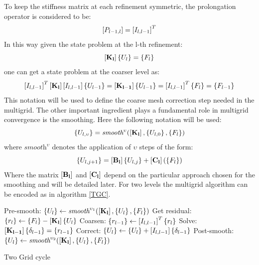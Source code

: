  To keep the stiffness matrix at each refinement symmetric, the prolongation operator is considered to be:
 \begin{equation}
 \left[{P_{l-1,l}}\right]=\left[{I_{l,l-1}}\right]^T
 \end{equation}
 In this way given the state problem at the l-th refinement:
 \begin{equation}
 \left[{\mathbf{K_{l}}}\right]\left\lbrace{U_{l}}\right \rbrace=\left\lbrace{F_{l}}\right \rbrace
 \end{equation}
 one can get a state problem at the coarser level as:
  \begin{equation}
  \left[{I_{l,l-1}}\right]^T \left[{\mathbf{K_{l}}}\right]\left[{I_{l,l-1}}\right]\left\lbrace{U_{l-1}}\right \rbrace=\left[{\mathbf{K_{l-1}}}\right]\left\lbrace{U_{l-1}}\right \rbrace=\left[{I_{l,l-1}}\right]^T\left\lbrace{F_{l}}\right \rbrace=\left\lbrace{F_{l-1}}\right \rbrace
  \end{equation}
  This notation will be used to define the coarse mesh correction step needed in the multigrid. The other important ingredient plays a fundamental role in multigrid convergence is the smoothing.
  Here the following notation will be used:
  \begin{equation}
 \left\lbrace{U_{l,\upsilon}}\right \rbrace=\textit{smooth}^{\upsilon}(\left[{\mathbf{K_{l}}}\right],\left\lbrace{U_{l,0}}\right \rbrace,\left\lbrace{F_{l}}\right \rbrace)
  \end{equation}
  where $\textit{smooth}^{\upsilon}$ denotes the application of $\upsilon$ steps of the form:
  \begin{equation}
 \left\lbrace{ U_{l,j+1}}\right \rbrace= \left[{\mathbf{B_{l}}}\right]\left\lbrace{U_{l,j}}\right \rbrace+\left[{\mathbf{C_{l}}}\right]\left(\left\lbrace{F_{l}}\right \rbrace\right)
  \end{equation}
  Where the matrix $\left[{\mathbf{B_{l}}}\right]$ and $\left[{\mathbf{C_{l}}}\right]$ depend on the particular approach chosen for the smoothing and will be detailed later. For two levels the multigrid algorithm can be encoded as in algorithm \ref{TGC}.
  \begin{algorithm}
 Pre-smooth: $\left\lbrace{U_{l}}\right \rbrace\gets\textit{smooth}^{\upsilon_1}(\left[{\mathbf{K_{l}}}\right],\left\lbrace{U_{l}}\right \rbrace,\left\lbrace{F_{l}}\right \rbrace)$\;
 Get residual: $\left\lbrace{r_{l}}\right \rbrace\gets\left\lbrace{F_{l}}\right \rbrace-\left[{\mathbf{K_{l}}}\right]\left\lbrace{U_{l}}\right \rbrace$\;
 Coarsen: $\left\lbrace{r_{l-1}}\right \rbrace\gets\left[{I_{l,l-1}}\right]^T\left\lbrace{r_{l}}\right \rbrace$\;
 Solve: $\left[{\mathbf{K_{l-1}}}\right]\left\lbrace{\delta_{l-1}}\right \rbrace=\left\lbrace{r_{l-1}}\right \rbrace$\;
 Correct: $\left\lbrace{U_{l}}\right \rbrace\gets\left\lbrace{U_{l}}\right \rbrace+\left[{I_{l,l-1}}\right]\left\lbrace{\delta_{l-1}}\right \rbrace$\;
 Post-smooth: $\left\lbrace{U_{l}}\right \rbrace\gets\textit{smooth}^{\upsilon_2}(\left[{\mathbf{K_{l}}}\right],\left\lbrace{U_{l}}\right \rbrace,\left\lbrace{F_{l}}\right \rbrace)$\;
   \caption{Two Grid cycle \label{TGC}}
  \end{algorithm}
